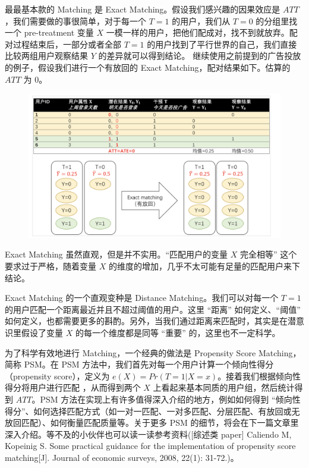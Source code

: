 \documentclass[12pt]{article}
\begin{document}
最最基本款的 Matching 是 Exact Matching。假设我们感兴趣的因果效应是 $ATT$，我们需要做的事很简单，对于每一个 $T=1$ 的用户，我们从 $T=0$ 的分组里找一个 pre-treatment 变量 $X$ 一模一样的用户，把他们配成对，找不到就放弃。配对过程结束后，一部分或者全部 $T=1$ 的用户找到了平行世界的自己，我们直接比较两组用户观察结果 $Y$ 的差异就可以得到结论。 继续使用之前提到的广告投放的例子，假设我们进行一个有放回的 Exact Matching，配对结果如下。估算的 $ATT$ 为 0。
\begin{figure}[H]
    \centering
    \includegraphics[width=1\textwidth]{fig/CasualInference-Game-Ad-2.png}
\end{figure}

Exact Matching 虽然直观，但是并不实用。“匹配用户的变量  $X$ 完全相等” 这个要求过于严格，随着变量 $X$ 的维度的增加，几乎不太可能有足量的匹配用户来下结论。

Exact Matching 的一个直观变种是 Distance Matching。我们可以对每一个 $T=1$ 的用户匹配一个距离最近并且不超过阈值的用户。这里 “距离” 如何定义、“阈值” 如何定义，也都需要更多的斟酌。另外，当我们通过距离来匹配时，其实是在潜意识里假设了变量 $X$ 的每一个维度都是同等 “重要” 的，这里也不一定科学。

为了科学有效地进行 Matching，一个经典的做法是 Propensity Score Matching，简称 PSM。在 PSM 方法中，我们首先对每一个用户计算一个倾向性得分（propensity score），定义为 $e(X)=Pr(T=1|X=x)$。接着我们根据倾向性得分将用户进行匹配 ，从而得到两个 $X$ 上看起来基本同质的用户组，然后统计得到 $ATT$。PSM 方法在实现上有许多值得深入介绍的地方，例如如何得到 “倾向性得分”、如何选择匹配方式（如一对一匹配、一对多匹配、分层匹配、有放回或无放回匹配）、如何衡量匹配质量等。关于更多 PSM 的细节，将会在下一篇文章里深入介绍。等不及的小伙伴也可以读一读参考资料([综述类 paper] Caliendo M, Kopeinig S. Some practical guidance for the implementation of propensity score matching[J]. Journal of economic surveys, 2008, 22(1): 31-72.)。
\end{document}
